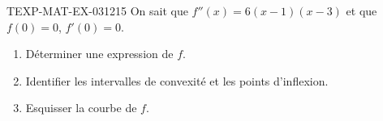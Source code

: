 \begin{exercice}{TEXP-MAT-EX-031}{2}{15}
On sait que $f''(x) = 6(x-1)(x-3)$ et que $f(0) = 0$, $f'(0) = 0$.
\begin{enumerate}
  \item Déterminer une expression de $f$.
  \item Identifier les intervalles de convexité et les points d'inflexion.
  \item Esquisser la courbe de $f$.
\end{enumerate}

\end{exercice}
